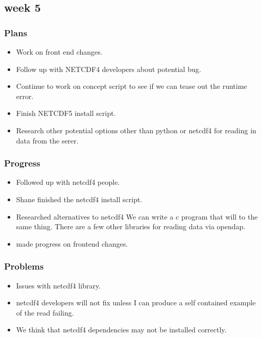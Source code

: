 \documentclass[onecolumn, draftclsnofoot,10pt, compsoc]{article}
\begin{document}
		\subsection{week 5}
			\subsubsection{Plans}
				\begin{itemize}
					\item Work on front end changes.
					\item Follow up with NETCDF4 developers about potential bug.
					\item Continue to work on concept script to see if we can tease out the runtime error.
					\item Finish NETCDF5 install script.
					\item Research other potential options other than python or netcdf4 for reading in data from the serer.\\

				\end{itemize}
			\subsubsection{Progress}
				\begin{itemize}
					\item Followed up with netcdf4 people.
					\item Shane finished the netcdf4 install script.
					\item Researched alternatives to netcdf4 We can write a c program that will to the same thing. There are a few other libraries for reading data via opendap.
					\item made progress on frontend changes.
				\end{itemize}

			\subsubsection{Problems}
				\begin{itemize}
					\item Issues with netcdf4 library.
					\item netcdf4 developers will not fix unless I can produce a self contained example of the read failing.
					\item We think that netcdf4 dependencies may not be installed correctly.
				\end{itemize}
\end{document}
